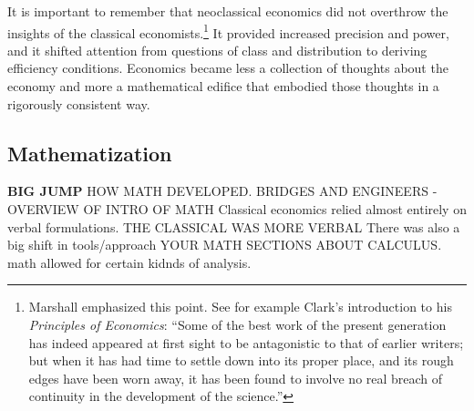
It is important to remember that neoclassical economics did not overthrow the insights of the classical economists.\footnote{ Marshall emphasized this point. See for example Clark's introduction to his \textit{Principles of Economics}: ``Some of the best work of the present generation has indeed appeared at first sight to be antagonistic to that of earlier writers; but when it has had time to settle down into its proper place, and its rough edges have been worn away, it has been found to involve no real breach of continuity in the development of the science.''} It provided increased precision and power, and it shifted attention from questions of class and distribution to deriving efficiency conditions. Economics became less a collection of thoughts about the economy and more a mathematical edifice that embodied those thoughts in a rigorously consistent way. 



\subsection{Mathematization}
\textbf{BIG JUMP}
HOW MATH DEVELOPED.
BRIDGES AND ENGINEERS - OVERVIEW OF INTRO OF MATH
Classical economics relied almost entirely on verbal formulations.
THE CLASSICAL WAS MORE VERBAL
There was also a big shift in tools/approach  YOUR MATH SECTIONS ABOUT CALCULUS. math allowed for certain kidnds of analysis.

